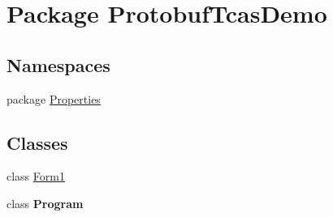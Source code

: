 \hypertarget{namespace_protobuf_tcas_demo}{}\section{Package Protobuf\+Tcas\+Demo}
\label{namespace_protobuf_tcas_demo}
\subsection*{Namespaces}
\begin{DoxyCompactItemize}
\item 
package \hyperlink{namespace_protobuf_tcas_demo_1_1_properties}{Properties}
\end{DoxyCompactItemize}
\subsection*{Classes}
\begin{DoxyCompactItemize}
\item 
class \hyperlink{class_protobuf_tcas_demo_1_1_form1}{Form1}
\item 
class {\bfseries Program}
\end{DoxyCompactItemize}
